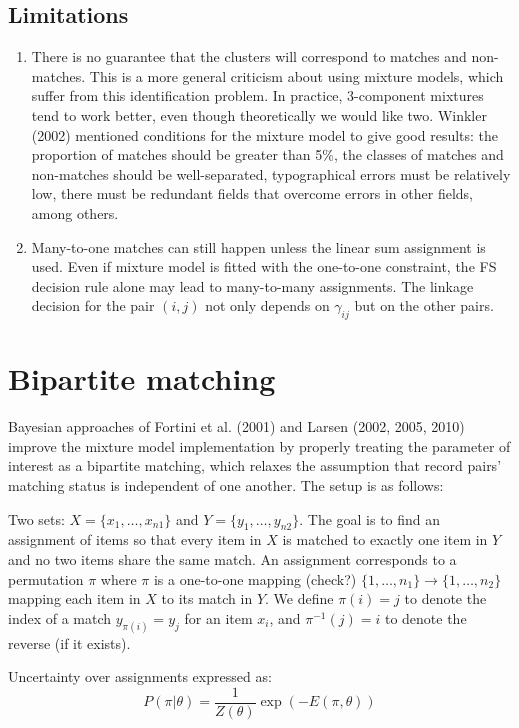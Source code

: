 \documentclass[11pt,reqno]{amsart}
\begin{document}
\subsection{Limitations}
\begin{enumerate}
\item There is no guarantee that the clusters will correspond to matches and non-matches.  This is a more general criticism about using mixture models, which suffer from this identification problem.  In practice, 3-component mixtures tend to work better, even though theoretically we would like two.  Winkler (2002) mentioned conditions for the mixture model to give good results: the proportion of matches should be greater than 5\%, the classes of matches and non-matches should be well-separated, typographical errors must be relatively low, there must be redundant fields that overcome errors in other fields, among others. 
\item Many-to-one matches can still happen unless the linear sum assignment is used.  Even if mixture model is fitted with the one-to-one constraint, the FS decision rule alone may lead to many-to-many assignments.  The linkage decision for the pair $(i,j)$ not only depends on $\gamma_{ij}$ but on the other pairs. 
\end{enumerate}


\section{Bipartite matching}
Bayesian approaches of Fortini et al. (2001) and Larsen (2002, 2005, 2010) improve the mixture model implementation by properly treating the parameter of interest as a bipartite matching, which relaxes the assumption that record pairs' matching status is independent of one another.  The setup is as follows:

Two sets: $X = \{x_1, \dots, x_{n1}\}$ and $Y = \{y_1, \dots, y_{n2}\}$. The goal is to find an assignment of items so that every item in $X$ is matched to exactly one item in $Y$ and no two items share the same match.  An assignment corresponds to a permutation $\pi$ where $\pi$ is a one-to-one mapping (check?) $\{1, \dots, n_1\} \to \{1, \dots, n_2\}$ mapping each item in $X$ to its match in $Y$.  We define $\pi(i) = j$ to denote the index of a match $y_{\pi(i)} = y_j$ for an item $x_i$, and $\pi^{-1}(j) = i$ to denote the reverse (if it exists). 

Uncertainty over assignments expressed as:
\[ P(\pi | \theta)  = \frac{1}{Z(\theta)} \exp(-E(\pi,\theta))\]
\end{document}
